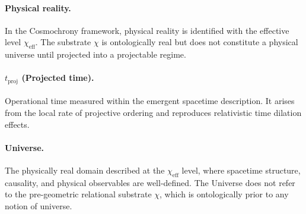   \paragraph{Physical reality.}
    In the Cosmochrony framework, physical reality is identified with the effective
    level $\chi_{\mathrm{eff}}$.
    The substrate $\chi$ is ontologically real but does not constitute a physical
    universe until projected into a projectable regime.

  \paragraph{\texorpdfstring{$t_{\mathrm{proj}}$}{tproj} (Projected time).}
    Operational time measured within the emergent spacetime description.
    It arises from the local rate of projective ordering and reproduces relativistic
    time dilation effects.

  \paragraph{Universe.}
    The physically real domain described at the $\chi_{\mathrm{eff}}$ level, where
    spacetime structure, causality, and physical observables are well-defined.
    The Universe does not refer to the pre-geometric relational substrate $\chi$,
    which is ontologically prior to any notion of universe.
